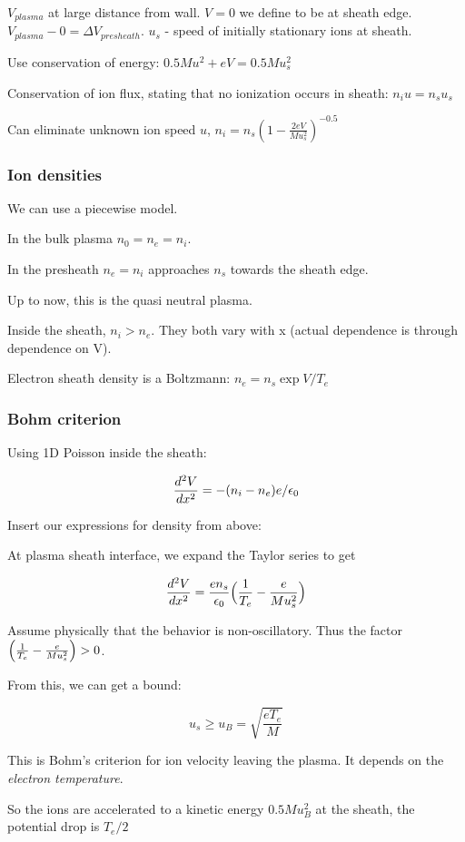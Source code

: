 \documentclass[PlasmaNotes.tex]{subfiles}
\begin{document}
$V_{plasma}$ at large distance from wall. $V=0$ we define to be at sheath edge. $V_{plasma}-0 = \Delta V_{presheath}$. $u_s$ - speed of initially stationary ions at sheath.

Use conservation of energy: $0.5 M u^2 + e V = 0.5 M u_s^2$

Conservation of ion flux, stating that no ionization occurs in sheath: $n_i u = n_s u_s$

Can eliminate unknown ion speed $u$, $n_i = n_s (1-\frac{2 e V}{M u_s^2})^{-0.5}$

\subsubsection{Ion densities}

We can use a piecewise model.

In the bulk plasma $n_0=n_e=n_i$.

In the presheath $n_e = n_i$ approaches $n_s$ towards the sheath edge.

Up to now, this is the quasi neutral plasma.

Inside the sheath, $n_i > n_e$. They both vary with x (actual dependence is through dependence on V).

Electron sheath density is a Boltzmann: $n_e = n_s \exp{V/T_e}$

\subsubsection{Bohm criterion}

Using 1D Poisson inside the sheath:

\[ \frac{d^2 V}{d x^2} = -(n_i - n_e) e /\epsilon_0 \]

Insert our expressions for density from above:

At plasma sheath interface, we expand the Taylor series to get

\[ \frac{d^2 V}{d x^2} = \frac{e n_s}{\epsilon_0} \Big(\frac{1}{T_e} - \frac{e}{M u_s^2}\Big) \]

Assume physically that the behavior is non-oscillatory. Thus the factor $\Big(\frac{1}{T_e} - \frac{e}{M u_s^2}\Big) >0 $.

From this, we can get a bound:

\[ u_s \geq u_B = \sqrt{\frac{e T_e}{M}} \]

This is Bohm's criterion for ion velocity leaving the plasma. It depends on the \emph{electron temperature}. 

So the ions are accelerated to a kinetic energy $0.5 M u_B^2$ at the sheath, the potential drop is $T_e/2$
\end{document}
